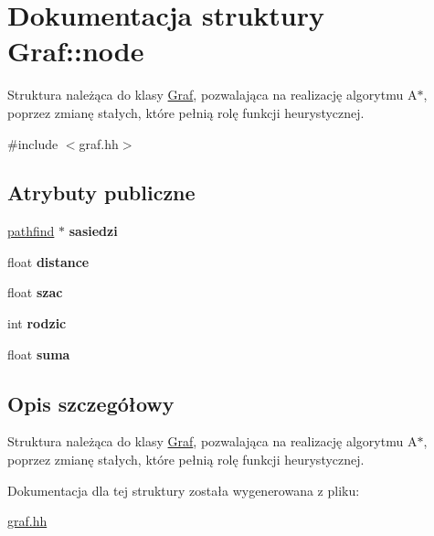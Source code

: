 \hypertarget{struct_graf_1_1node}{\section{\-Dokumentacja struktury \-Graf\-:\-:node}
\label{struct_graf_1_1node}
}


\-Struktura należąca do klasy \hyperlink{class_graf}{\-Graf}, pozwalająca na realizację algorytmu \-A$\ast$, poprzez zmianę stałych, które pełnią rolę funkcji heurystycznej.  




{\ttfamily \#include $<$graf.\-hh$>$}

\subsection*{\-Atrybuty publiczne}
\begin{DoxyCompactItemize}
\item 
\hypertarget{struct_graf_1_1node_a4b69261581d583790816963197a2836a}{\hyperlink{struct_graf_1_1pathfind}{pathfind} $\ast$ {\bfseries sasiedzi}}\label{struct_graf_1_1node_a4b69261581d583790816963197a2836a}

\item 
\hypertarget{struct_graf_1_1node_aec6eebfb2f221601273ec970da7ba466}{float {\bfseries distance}}\label{struct_graf_1_1node_aec6eebfb2f221601273ec970da7ba466}

\item 
\hypertarget{struct_graf_1_1node_a5b912d2036291c3e997cda5ea9a78099}{float {\bfseries szac}}\label{struct_graf_1_1node_a5b912d2036291c3e997cda5ea9a78099}

\item 
\hypertarget{struct_graf_1_1node_a087afedd0b4deece611c850cdf342319}{int {\bfseries rodzic}}\label{struct_graf_1_1node_a087afedd0b4deece611c850cdf342319}

\item 
\hypertarget{struct_graf_1_1node_a03106a81fb009213dbb3ea5df6d9b3f4}{float {\bfseries suma}}\label{struct_graf_1_1node_a03106a81fb009213dbb3ea5df6d9b3f4}

\end{DoxyCompactItemize}


\subsection{\-Opis szczegółowy}
\-Struktura należąca do klasy \hyperlink{class_graf}{\-Graf}, pozwalająca na realizację algorytmu \-A$\ast$, poprzez zmianę stałych, które pełnią rolę funkcji heurystycznej. 



\-Dokumentacja dla tej struktury została wygenerowana z pliku\-:\begin{DoxyCompactItemize}
\item 
\hyperlink{graf_8hh}{graf.\-hh}\end{DoxyCompactItemize}
